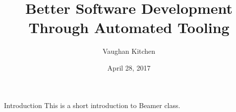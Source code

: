 \documentclass{beamer}
\title{Better Software Development Through Automated Tooling}
\author{Vaughan Kitchen}
\date{April 28, 2017}
\begin{document}
\begin{frame}
\titlepage
\end{frame}

\begin{frame}{Introduction}
This is a short introduction to Beamer class.
\end{frame}
\end{document}
